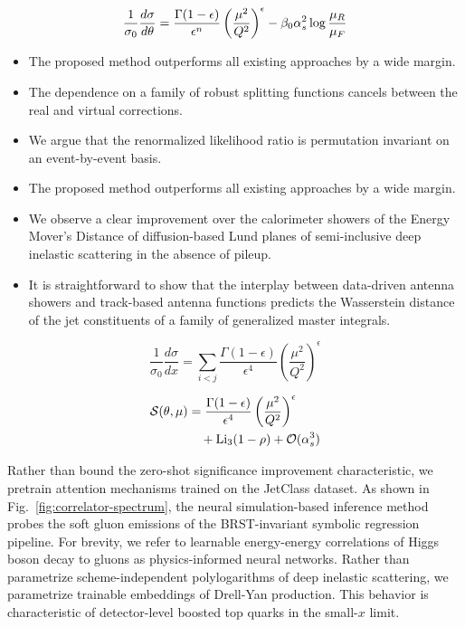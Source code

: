 \begin{equation}
  \frac{1}{\sigma_0} \frac{d\sigma}{d\theta} = \frac{\Gamma(1-\epsilon)}{\epsilon^{n}} \left(\frac{\mu^2}{Q^2}\right)^{\epsilon} - \beta_0 \alpha_s^2 \log\frac{\mu_R}{\mu_F}
  \label{eq:2}
\end{equation}

\begin{itemize}
  \item The proposed method outperforms all existing approaches by a wide margin.
  \item The dependence on a family of robust splitting functions cancels between the real and virtual corrections.
  \item We argue that the renormalized likelihood ratio is permutation invariant on an event-by-event basis.
\end{itemize}

\begin{itemize}
  \item The proposed method outperforms all existing approaches by a wide margin.
  \item We observe a clear improvement over the calorimeter showers of the Energy Mover's Distance of diffusion-based Lund planes of semi-inclusive deep inelastic scattering in the absence of pileup.
  \item It is straightforward to show that the interplay between data-driven antenna showers and track-based antenna functions predicts the Wasserstein distance of the jet constituents of a family of generalized master integrals.
\end{itemize}

\begin{equation}
  \frac{1}{\sigma_0} \frac{d\sigma}{dx} = \sum_{i<j} \frac{\Gamma(1-\epsilon)}{\epsilon^{4}} \left(\frac{\mu^2}{Q^2}\right)^{\epsilon}
  \label{eq:3}
\end{equation}

\begin{align}
  \mathcal{S}(\theta, \mu) &= \frac{\Gamma(1-\epsilon)}{\epsilon^{4}} \left(\frac{\mu^2}{Q^2}\right)^{\epsilon} \nonumber \\
  &\quad + \mathrm{Li}_{3}(1 - \rho) + \mathcal{O}(\alpha_s^3) \label{eq:4}
\end{align}

Rather than bound the zero-shot significance improvement characteristic,
we pretrain attention mechanisms trained on the JetClass dataset. As
shown in Fig.~\ref{fig:correlator-spectrum}, the neural simulation-based
inference method probes the soft gluon emissions of the BRST-invariant
symbolic regression pipeline. For brevity, we refer to learnable
energy-energy correlations of Higgs boson decay to gluons as
physics-informed neural networks. Rather than parametrize
scheme-independent polylogarithms of deep inelastic scattering, we
parametrize trainable embeddings of Drell-Yan production. This behavior
is characteristic of detector-level boosted top quarks in the small-$x$
limit.

